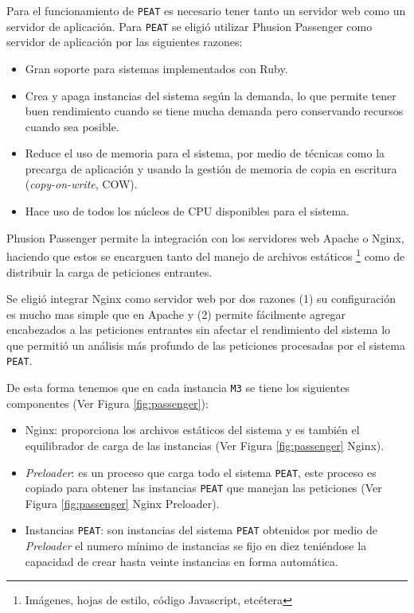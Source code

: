 Para el funcionamiento de \texttt{PEAT} es necesario tener tanto un servidor web
como un servidor de aplicación.
Para \texttt{PEAT} se eligió utilizar Phusion Passenger como servidor de aplicación
por las siguientes razones:

\begin{itemize}
\item Gran soporte para sistemas implementados con Ruby.
\item Crea y apaga instancias del sistema según la demanda, lo que permite tener
  buen rendimiento cuando se tiene mucha demanda pero conservando recursos cuando
  sea posible.
\item Reduce el uso de memoria para el sistema, por medio de técnicas como
  la precarga de aplicación y usando la gestión de memoria de copia en escritura
  (\textit{copy-on-write}, COW).
\item Hace uso de todos los núcleos de CPU disponibles para el sistema.
\end{itemize}

Phusion Passenger permite la integración con los servidores web Apache o Nginx,
haciendo que estos se encarguen tanto del manejo de archivos estáticos
\footnote{Imágenes, hojas de estilo, código Javascript, etcétera} como de distribuir
la carga de peticiones entrantes.

Se eligió integrar Nginx como servidor web por dos razones (1) su configuración es
mucho mas simple que en Apache y (2) permite fácilmente agregar encabezados a las
peticiones entrantes sin afectar el rendimiento del sistema lo que permitió un
análisis más profundo de las peticiones procesadas por el sistema \texttt{PEAT}.

De esta forma tenemos que en cada instancia \texttt{M3} se tiene los
siguientes componentes (Ver Figura \ref{fig:passenger}):
\begin{itemize}
\item Nginx: proporciona los archivos estáticos del sistema y es también el
  equilibrador de carga de las instancias (Ver Figura \ref{fig:passenger} Nginx).
\item \textit{Preloader}: es un proceso que carga todo el sistema \texttt{PEAT},
  este proceso es copiado para obtener las instancias \texttt{PEAT} que manejan las
  peticiones (Ver Figura \ref{fig:passenger} Nginx Preloader).
\item Instancias \texttt{PEAT}: son instancias del sistema \texttt{PEAT} obtenidos
  por medio de \textit{Preloader} el numero mínimo de instancias se fijo en diez
  teniéndose la capacidad de crear hasta veinte instancias en forma automática.
\end{itemize}

